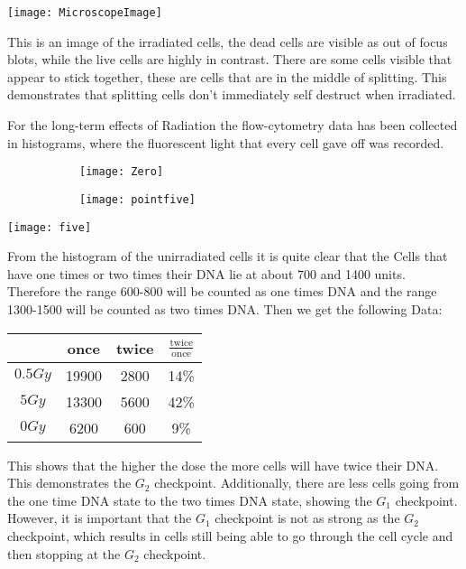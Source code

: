 \documentclass[]{scrartcl}
\begin{document}
\texttt{[image: MicroscopeImage]}

This is an image of the irradiated cells, the dead cells are visible as out of focus blots, while the live cells are highly in contrast. There are some cells visible that appear to stick together, these are cells that are in the middle of splitting. This demonstrates that splitting cells don't immediately self destruct when irradiated.

\newpage

For the long-term effects of Radiation the flow-cytometry data has been collected in histograms, where the fluorescent light that every cell gave off was recorded.

\begin{center}
\begin{figure}[h]
	\begin{subfigure}{0.5\textwidth}
		\texttt{[image: Zero]}
	\end{subfigure}
	\begin{subfigure}{0.5\textwidth}
		\texttt{[image: pointfive]}
	\end{subfigure}
\end{figure}
\end{center}
\begin{center}
\texttt{[image: five]}
\end{center}
From the histogram of the unirradiated cells it is quite clear that the Cells that have one times or two times their DNA lie at about 700 and 1400 units. Therefore the range 600-800 will be counted as one times DNA and the range 1300-1500 will be counted as two times DNA. Then we get the following Data:
\begin{center}
	\begin{tabular}{|c||c|c|c|}
		\hline
		& once & twice & $\frac{\text{twice}}{\text{once}}$\\ \hline\hline
		$0.5Gy$ & 19900 & 2800 & 14\% \\
		$5Gy$ & 13300 & 5600 & 42\% \\
		$0Gy$ & 6200 & 600 & 9\% \\
		\hline
	\end{tabular}
\end{center}
This shows that the higher the dose the more cells will have twice their DNA. This demonstrates the $G_2$ checkpoint. Additionally, there are less cells going from the one time DNA state to the two times DNA state, showing the $G_1$ checkpoint. However, it is important that the $G_1$ checkpoint is not as strong as the $G_2$ checkpoint, which results in cells still being able to go through the cell cycle and then stopping at the $G_2$ checkpoint.
\end{document}
